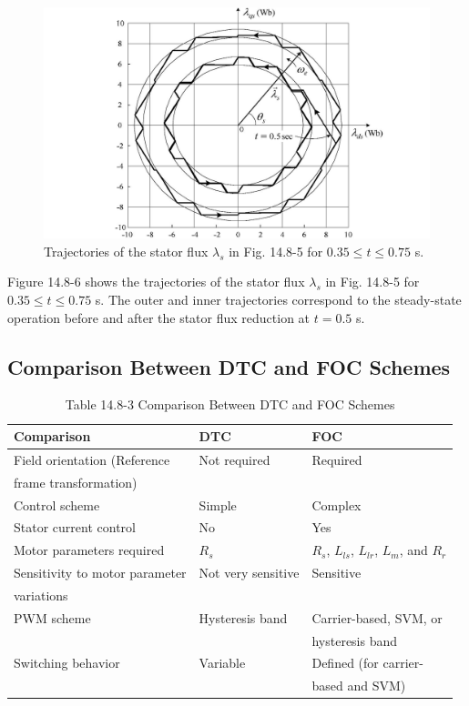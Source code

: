 \documentclass[letterpaper,12pt]{article}
\begin{document}
\begin{figure}[h]
\centering
\includegraphics{graficos/img28.jpg}
\caption{Trajectories of the stator flux $\lambda_s$ in Fig. 14.8-5 for $0.35 \leq t \leq 0.75$ s.}
\label{fig:14.8-6}
\end{figure}
\FloatBarrier

Figure 14.8-6 shows the trajectories of the stator flux $\lambda_s$ in Fig. 14.8-5 for $0.35 \leq t \leq 0.75$ s. The outer and inner trajectories correspond to the steady-state operation before and after the stator flux reduction at $t = 0.5$ s.

\subsection{Comparison Between DTC and FOC Schemes}

\begin{table}[h]
    \centering
    \caption{Table 14.8-3 Comparison Between DTC and FOC Schemes}
    \begin{tabular}{l l l}
        \hline
        \textbf{Comparison} & \textbf{DTC} & \textbf{FOC} \\
        \hline
        Field orientation (Reference & Not required & Required \\
            frame transformation) & & \\
        Control scheme & Simple & Complex \\
        Stator current control & No & Yes \\
        Motor parameters required & $R_s$ & $R_s$, $L_{ls}$, $L_{lr}$, $L_m$, and $R_r$ \\
        Sensitivity to motor parameter & Not very sensitive & Sensitive \\
        variations & & \\
        PWM scheme & Hysteresis band & Carrier-based, SVM, or \\
        & & hysteresis band \\
        Switching behavior & Variable & Defined (for carrier- \\
        & & based and SVM) \\
        \hline
    \end{tabular}
    
    \label{table:14.8-3}
\end{table}
\FloatBarrier
\end{document}
